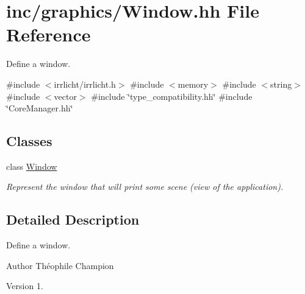 \hypertarget{Window_8hh}{}\section{inc/graphics/\+Window.hh File Reference}
\label{Window_8hh}


Define a window.  


{\ttfamily \#include $<$irrlicht/irrlicht.\+h$>$}\newline
{\ttfamily \#include $<$memory$>$}\newline
{\ttfamily \#include $<$string$>$}\newline
{\ttfamily \#include $<$vector$>$}\newline
{\ttfamily \#include \char`\"{}type\+\_\+compatibility.\+hh\char`\"{}}\newline
{\ttfamily \#include \char`\"{}Core\+Manager.\+hh\char`\"{}}\newline
\subsection*{Classes}
\begin{DoxyCompactItemize}
\item 
class \hyperlink{classWindow}{Window}
\begin{DoxyCompactList}\small\item\em Represent the window that will print some scene (view of the application). \end{DoxyCompactList}\end{DoxyCompactItemize}


\subsection{Detailed Description}
Define a window. 

\begin{DoxyAuthor}{Author}
Théophile Champion 
\end{DoxyAuthor}
\begin{DoxyVersion}{Version}
1. 
\end{DoxyVersion}
